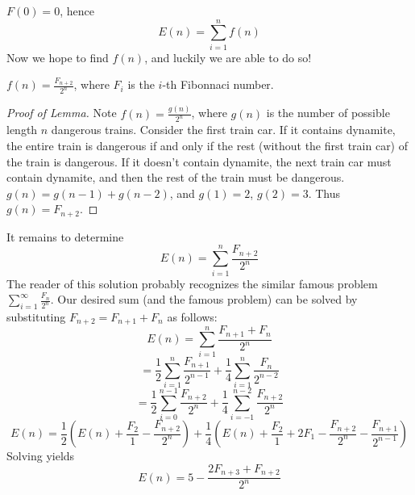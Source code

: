 \begin{enumerate}[align=left,start=1,label=\textbf{\textcolor{meablue}{Problem \arabic*}}]
\begin{solution}
        $F(0) = 0$, hence 
        \[E(n) = \sum_{i = 1}^{n} f(n)\]
        Now we hope to find $f(n)$, and luckily we are able to do so!
        \begin{lemma}
            $f(n) = \frac{F_{n + 2}}{2^n}$, where $F_i$ is the $i$-th Fibonnaci number.
        \end{lemma}
        \begin{proof}[Proof of Lemma]
            Note $f(n) = \frac{g(n)}{2^n}$, where $g(n)$ is the number of possible length $n$ dangerous trains. Consider the first train car. If it contains dynamite, the entire train is dangerous if and only if the rest (without the first train car) of the train is dangerous. If it doesn't contain dynamite, the next train car must contain dynamite, and then the rest of the train must be dangerous. $g(n) = g(n - 1) + g(n - 2)$, and $g(1) = 2$, $g(2) = 3$. Thus $g(n) = F_{n + 2}$.
        \end{proof}

        It remains to determine 
        \[E(n) = \sum_{i = 1}^{n} \frac{F_{n + 2}}{2^n}\]
        The reader of this solution probably recognizes the similar famous problem $\sum_{i=1}^{\infty} \frac{F_n}{2^n}$. Our desired sum (and the famous problem) can be solved by substituting $F_{n + 2} = F_{n + 1} + F_{n}$ as follows:
        \[E(n) = \sum_{i = 1}^{n} \frac{F_{n + 1} + F_{n}}{2^n}\]
        \[= \frac{1}{2} \sum_{i = 1}^{n} \frac{F_{n + 1}}{2^{n- 1}} + \frac{1}{4} \sum_{i = 1}^{n} \frac{F_{n}}{2^{n - 2}}\]
        \[= \frac{1}{2} \sum_{i = 0}^{n - 1} \frac{F_{n + 2}}{2^{n}} + \frac{1}{4} \sum_{i = -1}^{n - 2} \frac{F_{n + 2}}{2^{n}}\]
        \[E(n) = \frac{1}{2}(E(n) + \frac{F_2}{1} - \frac{F_{n + 2}}{2^n}) + \frac{1}{4}(E(n) + \frac{F_2}{1} + 2F_1 - \frac{F_{n + 2}}{2^n} - \frac{F_{n + 1}}{2^{n - 1}})\]
        Solving yields
        \[E(n) = 5 - \frac{2F_{n + 3} + F_{n + 2}}{2^n}\]
    \end{solution}
\end{enumerate}
 
\newpage 
{}

